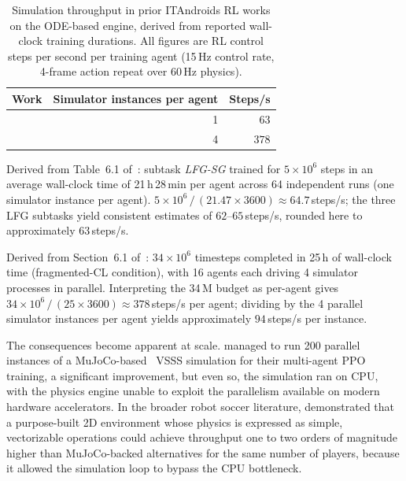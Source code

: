 \begin{table}[ht]
    \centering
    \caption{Simulation throughput in prior ITAndroids RL works on the
    ODE-based engine, derived from reported wall-clock training durations.
    All figures are RL control steps per second per training agent
    (15\,Hz control rate, 4-frame action repeat over 60\,Hz physics).}
    \label{tab:legacy_throughput}
    \begin{threeparttable}
    \begin{tabular}{lrr}
        \toprule
        \textbf{Work} & \textbf{Simulator instances per agent} &
        \textbf{Steps/s} \\
        \midrule
        \cite{tg_thay} &
            1 & $63$\tnote{a} \\
        \cite{master_thiago} &
            4 & $378$\tnote{b} \\
        \bottomrule
    \end{tabular}
    \begin{tablenotes}\small
        \item[a] Derived from Table~6.1 of~\cite{tg_thay}:
        subtask \textit{LFG-SG} trained for $5\times10^{6}$ steps in an
        average wall-clock time of 21\,h\,28\,min per agent across 64
        independent runs (one simulator instance per agent).
        $5{\times}10^{6}\,/\,(21.47\times3600)\approx64.7$\,steps/s; the
        three LFG subtasks yield consistent estimates of $62$--$65$\,steps/s,
        rounded here to approximately $63$\,steps/s.
        \item[b] Derived from Section~6.1 of~\cite{master_thiago}:
        $34\times10^{6}$ timesteps completed in 25\,h of wall-clock time
        (fragmented-CL condition), with 16 agents each driving 4 simulator
        processes in parallel.  Interpreting the 34\,M budget as per-agent
        gives $34{\times}10^{6}\,/\,(25\times3600)\approx378$\,steps/s per
        agent; dividing by the 4 parallel simulator instances per agent
        yields approximately $94$\,steps/s per instance.
    \end{tablenotes}
    \end{threeparttable}
\end{table}

The consequences become apparent at scale.  \textcite{brandao2022} managed
to run 200 parallel instances of a MuJoCo-based~\cite{todorov2012mujoco} VSSS simulation for their
multi-agent PPO training, a significant improvement, but even so, the
simulation ran on CPU, with the physics engine unable to exploit the
parallelism available on modern hardware accelerators.  In the broader robot
soccer literature, \textcite{scaling_marl_2d} demonstrated that a purpose-built
2D environment whose physics is expressed as simple, vectorizable operations
could achieve throughput one to two orders of magnitude higher than
MuJoCo-backed alternatives for the same number of players, because
it allowed the simulation loop to bypass the CPU bottleneck.

